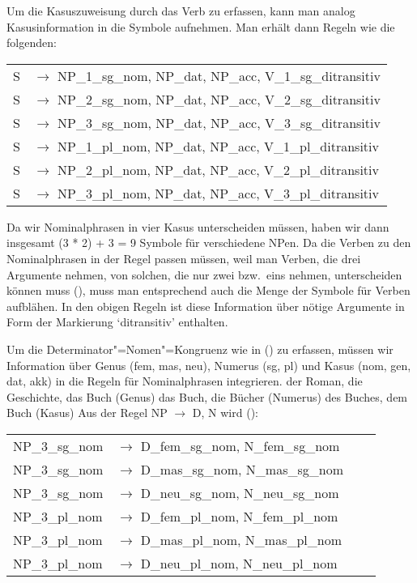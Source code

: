 Um die Kasuszuweisung durch das Verb zu erfassen, kann man analog Kasusinformation in die
Symbole aufnehmen. Man erhält dann Regeln wie die folgenden:
\ea
\label{ditrans-ps-regeln}
\begin{tabular}[t]{@{}l@{ }l}
S  & $\to$ NP\_1\_sg\_nom, NP\_dat, NP\_acc, V\_1\_sg\_ditransitiv\\
S  & $\to$ NP\_2\_sg\_nom, NP\_dat, NP\_acc, V\_2\_sg\_ditransitiv\\
S  & $\to$ NP\_3\_sg\_nom, NP\_dat, NP\_acc, V\_3\_sg\_ditransitiv\\
S  & $\to$ NP\_1\_pl\_nom, NP\_dat, NP\_acc, V\_1\_pl\_ditransitiv\\
S  & $\to$ NP\_2\_pl\_nom, NP\_dat, NP\_acc, V\_2\_pl\_ditransitiv\\
S  & $\to$ NP\_3\_pl\_nom, NP\_dat, NP\_acc, V\_3\_pl\_ditransitiv\\
\end{tabular}
\z
Da wir Nominalphrasen in vier Kasus unterscheiden müssen, haben wir dann
insgesamt (3 * 2) + 3 = 9 Symbole für verschiedene NPen. Da die Verben zu den Nominalphrasen
in der Regel passen müssen, weil man \zb Verben, die drei Argumente nehmen, von solchen,
die nur zwei bzw.\ eins nehmen, unterscheiden können muss (), muss man entsprechend auch
die Menge der Symbole für Verben aufblähen.
\eal
{}
\zl
In den obigen Regeln ist diese Information über nötige Argumente in Form der
Markierung `ditransitiv' enthalten.

Um die Determinator"=Nomen"=Kongruenz wie in () zu erfassen, müssen wir Information 
über Genus (fem, mas, neu), Numerus (sg, pl) und Kasus (nom, gen, dat, akk)
in die Regeln für Nominalphrasen integrieren.
\eal
\ex der Roman, die Geschichte, das Buch (Genus)
\ex das Buch, die Bücher (Numerus)
\ex des Buches, dem Buch (Kasus)
\zl
Aus der Regel NP $\to$ D, N wird ():
\ea
\begin{tabular}[t]{@{}l@{ }l@{\hspace{4mm}}l@{ }l}
NP\_3\_sg\_nom  & $\to$ D\_fem\_sg\_nom, N\_fem\_sg\_nom \\
NP\_3\_sg\_nom  & $\to$ D\_mas\_sg\_nom, N\_mas\_sg\_nom \\
NP\_3\_sg\_nom  & $\to$ D\_neu\_sg\_nom, N\_neu\_sg\_nom \\
NP\_3\_pl\_nom  & $\to$ D\_fem\_pl\_nom, N\_fem\_pl\_nom \\
NP\_3\_pl\_nom  & $\to$ D\_mas\_pl\_nom, N\_mas\_pl\_nom \\
NP\_3\_pl\_nom  & $\to$ D\_neu\_pl\_nom, N\_neu\_pl\_nom \\[2mm]
\end{tabular}


